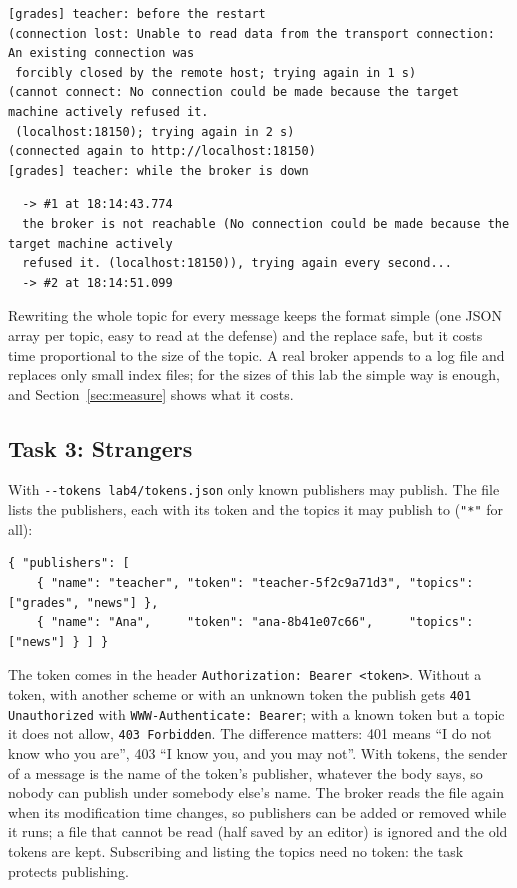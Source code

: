 \documentclass[11pt,a4paper]{article}
\newcommand{\notebox}[1]{\par\smallskip\noindent\colorbox{notebg}{\parbox{\dimexpr\linewidth-2\fboxsep}{\small #1}}\par\smallskip}
\newcommand{\code}[1]{{\frenchspacing\texttt{#1}}}
\begin{document}
\begin{lstlisting}
[grades] teacher: before the restart
(connection lost: Unable to read data from the transport connection: An existing connection was
 forcibly closed by the remote host; trying again in 1 s)
(cannot connect: No connection could be made because the target machine actively refused it.
 (localhost:18150); trying again in 2 s)
(connected again to http://localhost:18150)
[grades] teacher: while the broker is down
\end{lstlisting}
\begin{lstlisting}
  -> #1 at 18:14:43.774
  the broker is not reachable (No connection could be made because the target machine actively
  refused it. (localhost:18150)), trying again every second...
  -> #2 at 18:14:51.099
\end{lstlisting}

\notebox{Rewriting the whole topic for every message keeps the format simple (one JSON array per
topic, easy to read at the defense) and the replace safe, but it costs time proportional to the size
of the topic. A real broker appends to a log file and replaces only small index files; for the
sizes of this lab the simple way is enough, and Section~\ref{sec:measure} shows what it costs.}

\subsection{Task 3: Strangers}

With \code{-{}-tokens lab4/tokens.json} only known publishers may publish. The file lists the
publishers, each with its token and the topics it may publish to (\code{"*"} for all):

\begin{lstlisting}
{ "publishers": [
    { "name": "teacher", "token": "teacher-5f2c9a71d3", "topics": ["grades", "news"] },
    { "name": "Ana",     "token": "ana-8b41e07c66",     "topics": ["news"] } ] }
\end{lstlisting}

The token comes in the header \code{Authorization: Bearer <token>}. Without a token, with another
scheme or with an unknown token the publish gets \code{401 Unauthorized} with
\code{WWW-Authenticate: Bearer}; with a known token but a topic it does not allow, \code{403
Forbidden}. The difference matters: 401 means ``I do not know who you are'', 403 ``I know you, and
you may not''. With tokens, the sender of a message is the name of the token's publisher, whatever
the body says, so nobody can publish under somebody else's name. The broker reads the file again
when its modification time changes, so publishers can be added or removed while it runs; a file
that cannot be read (half saved by an editor) is ignored and the old tokens are kept. Subscribing
and listing the topics need no token: the task protects publishing.
\end{document}
